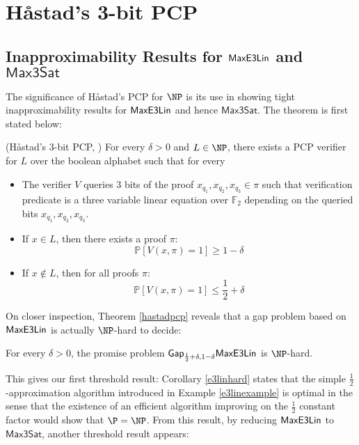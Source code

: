 \section{H\aa stad's 3-bit PCP}
\subsection{Inapproximability Results for $\mathsf{MaxE3Lin}$ and $\mathsf{Max3Sat}$}
The significance of H\aa stad's PCP for $\NP$ is its use in showing tight inapproximability results for $\mathsf{MaxE3Lin}$ and hence $\mathsf{Max3Sat}$. The theorem is first stated below:

\begin{theorem} \label{hastadpcp} (H\aa stad's 3-bit PCP, \cite{haastad2001some})
For every $\delta > 0$ and $L \in \NP$, there exists a PCP verifier for $L$ over the boolean alphabet such that for every
\begin{itemize}
  \item The verifier $V$ queries 3 bits of the proof $x_{q_1},x_{q_2}, x_{q_3} \in \pi$ such that verification predicate is a three variable linear equation over $\mathbb{F}_2$ depending on the queried bits $x_{q_1},x_{q_2}, x_{q_3}$.
  \item If $x \in L$, then there exists a proof $\pi$:
        \begin{equation}
          \mathbb{P}[V(x,\pi) = 1] \geq 1 - \delta
        \end{equation}
  \item If $x \not\in L$, then for all proofs $\pi$:
        \begin{equation}
          \mathbb{P}[V(x,\pi) = 1] \leq \frac{1}{2} + \delta
        \end{equation}
\end{itemize}
\end{theorem}

On closer inspection, Theorem \ref{hastadpcp} reveals that a gap problem based on $\mathsf{MaxE3Lin}$ is actually $\NP$-hard to decide:

\begin{corollary} \label{e3linhard}
For every $\delta >0$, the promise problem $\mathsf{Gap}_{\frac{1}{2} + \delta, 1 - \delta}\mathsf{MaxE3Lin}$ is $\NP$-hard.
\end{corollary}

This gives our first threshold result: Corollary \ref{e3linhard} states that the simple $\frac{1}{2}$-approximation algorithm introduced in Example \ref{e3linexample} is optimal in the sense that the existence of an efficient algorithm improving on the $\frac{1}{2}$ constant factor would show that $\P = \NP$. From this result, by reducing $\mathsf{MaxE3Lin}$ to $\mathsf{Max3Sat}$, another threshold result appears:


